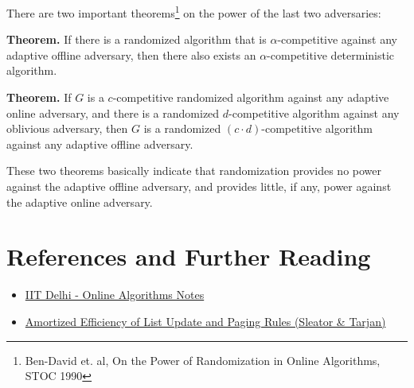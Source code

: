 \documentclass[14pt]{extreport}
\begin{document}
    \vspace{3mm}
    There are two important theorems\footnote{Ben-David et. al, On the Power of Randomization in Online Algorithms, STOC 1990} on the power of the last two adversaries:

    \vspace{3mm}
    \textbf{Theorem.} If there is a randomized algorithm that is $\alpha$-competitive against any adaptive offline adversary, then there also exists an $\alpha$-competitive deterministic algorithm.

    \vspace{3mm}
    \textbf{Theorem.} If $G$ is a $c$-competitive randomized algorithm against any adaptive online adversary, and there is a randomized $d$-competitive algorithm against any oblivious adversary, then $G$ is a randomized $(c \cdot d)$-competitive algorithm against any adaptive offline adversary.

    \vspace{2mm}
    These two theorems basically indicate that randomization provides no power against the adaptive offline adversary, and provides little, if any, power against the adaptive online adversary.

\section*{References and Further Reading}
\begin{itemize}
    \item \href{https://www.cse.iitd.ac.in/~Naveen/courses/CSL758/scribes/lec23.pdf}{IIT Delhi - Online Algorithms Notes}
    \item \href{https://www.cs.cmu.edu/~sleator/papers/competitive-paging.pdf}{Amortized Efficiency of List Update and Paging Rules (Sleator \& Tarjan)}
\end{itemize}
\end{document}
